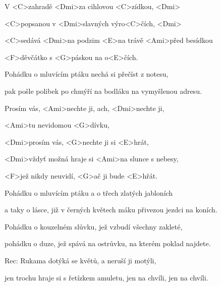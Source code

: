 

\zs
V <C>zahradě <Dmi>za cihlovou <C>zídkou, <Dmi>

<C>popsanou v <Dmi>slavných výro<C>čích, <Dmi>

<C>sedává <Dmi>na podzim <E>na trávě <Ami>před besídkou

<F>děvčátko s <G>páskou na o<E>čích.
\ks

\zs
Pohádku o mluvícím ptáku nechá si přečíst z notesu,

pak pošle polibek po chmýří na bodláku na vymyšlenou adresu.
\ks

\zr
Prosím vás, <Ami>nechte ji, ach, <Dmi>nechte ji,

<Ami>tu nevidomou <G>dívku,

<Dmi>prosím vás, <G>nechte ji si <E>hrát,

<Dmi>vždyť možná hraje si <Ami>na slunce s nebesy,

<F>jež nikdy neuvidí, <G>ač ji bude <E>hřát.
\kr

\zs
Pohádku o mluvícím ptáku a o třech zlatých jabloních

a taky o lásce, již v černých květech máku přivezou jezdci na koních.
\ks

\zs
Pohádku o kouzelném slůvku, jež vzbudí všechny zakleté,

pohádku o duze, jež spává na ostrůvku, na kterém poklad najdete.
\ks

\zr\kr

\zs
Rec: Rukama dotýká se květů, a neruší ji motýli,

jen trochu hraje si s řetízkem amuletu, jen na chvíli, jen na chvíli.
\ks

\zr\kr

\kp
